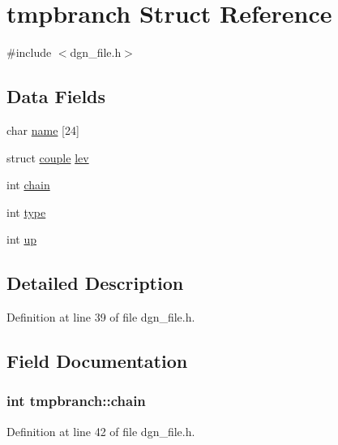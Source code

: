 \hypertarget{structtmpbranch}{\section{tmpbranch Struct Reference}
\label{structtmpbranch}
}


{\ttfamily \#include $<$dgn\+\_\+file.\+h$>$}

\subsection*{Data Fields}
\begin{DoxyCompactItemize}
\item 
char \hyperlink{structtmpbranch_a843f9c87ed77de34700c0d6a885c00b5}{name} \mbox{[}24\mbox{]}
\item 
struct \hyperlink{structcouple}{couple} \hyperlink{structtmpbranch_ac252dc9730d4ec4331c790df34565826}{lev}
\item 
int \hyperlink{structtmpbranch_ad32129f469c481c8281bc5c6a47b45a0}{chain}
\item 
int \hyperlink{structtmpbranch_a52ef1847b2633177de412c5e0490c93e}{type}
\item 
int \hyperlink{structtmpbranch_aaf8a1b40b676b026392ab8bd8f91bf87}{up}
\end{DoxyCompactItemize}


\subsection{Detailed Description}


Definition at line 39 of file dgn\+\_\+file.\+h.



\subsection{Field Documentation}
\hypertarget{structtmpbranch_ad32129f469c481c8281bc5c6a47b45a0}{
\subsubsection[{chain}]{\setlength{\rightskip}{0pt plus 5cm}int tmpbranch\+::chain}}\label{structtmpbranch_ad32129f469c481c8281bc5c6a47b45a0}


Definition at line 42 of file dgn\+\_\+file.\+h.



